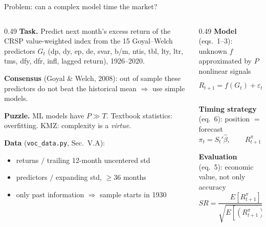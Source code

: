 \documentclass[aspectratio=169,11pt]{beamer}
\newcommand{\hl}[1]{\textcolor{acc}{\textbf{#1}}}
\begin{document}

\begin{frame}{Problem: can a complex model time the market?}
\begin{columns}[T]
\begin{column}{0.49\textwidth}
\footnotesize
\hl{Task.} Predict next month's excess return of the CRSP value-weighted index from the 15 Goyal--Welch predictors $G_t$ (dp, dy, ep, de, svar, b/m, ntis, tbl, lty, ltr, tms, dfy, dfr, infl, lagged return), 1926--2020.

\smallskip
\hl{Consensus} (Goyal \& Welch, 2008): out of sample these predictors do not beat the historical mean $\Rightarrow$ use simple models.

\smallskip
\hl{Puzzle.} ML models have $P\gg T$. Textbook statistics: overfitting. KMZ: complexity is a \emph{virtue}.

\smallskip
\hl{Data} (\texttt{voc\_data.py}, Sec.~V.A):
\begin{itemize}
\item returns $/$ trailing 12-month uncentered std
\item predictors $/$ expanding std, $\ge 36$ months
\item only past information $\Rightarrow$ sample starts in 1930
\end{itemize}
\end{column}
\begin{column}{0.49\textwidth}
\footnotesize
\hl{Model} (eqs.~1--3): unknown $f$ approximated by $P$ nonlinear signals
\[R_{t+1}=f(G_t)+\varepsilon_{t+1}\approx\sum_{i=1}^{P}S_{i,t}\,\beta_i+\varepsilon_{t+1}\]

\hl{Timing strategy} (eq.~6): position $=$ forecast
\[\pi_t=S_t'\hat\beta,\qquad R^{\pi}_{t+1}=\pi_t\,R_{t+1}\]

\hl{Evaluation} (eq.~5): economic value, not only accuracy
\[SR=\frac{E[R^{\pi}_{t+1}]}{\sqrt{E[(R^{\pi}_{t+1})^2]}}\]
\end{column}
\end{columns}
\end{frame}
\end{document}
